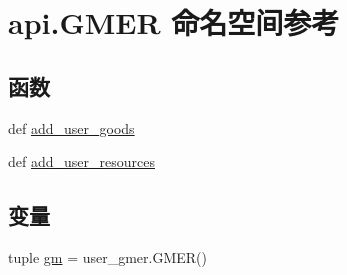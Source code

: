 \hypertarget{namespaceapi_1_1_g_m_e_r}{\section{api.\-G\-M\-E\-R 命名空间参考}
\label{namespaceapi_1_1_g_m_e_r}
}
\subsection*{函数}
\begin{DoxyCompactItemize}
\item 
def \hyperlink{namespaceapi_1_1_g_m_e_r_ac512e7983bb879b97f88e030c24357fc}{add\-\_\-user\-\_\-goods}
\item 
def \hyperlink{namespaceapi_1_1_g_m_e_r_a7cc1dd007d4bc39b3407e7b3b2916b3c}{add\-\_\-user\-\_\-resources}
\end{DoxyCompactItemize}
\subsection*{变量}
\begin{DoxyCompactItemize}
\item 
tuple \hyperlink{namespaceapi_1_1_g_m_e_r_a49d93c8ccbf5455b39e856e178b523a0}{gm} = user\-\_\-gmer.\-G\-M\-E\-R()
\end{DoxyCompactItemize}


